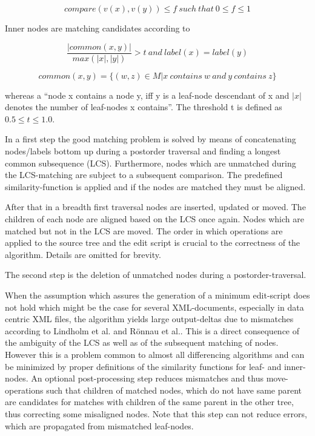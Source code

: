 \begin{equation} 
compare(v(x), v(y)) \leq f\ such\ that\ 0 \leq f \leq 1
\end{equation}

Inner nodes are matching candidates according to

\begin{equation}
\frac{|common(x, y)|}{max(|x|,|y|)} > t\ and\ label(x) = label(y)
\end{equation}

\begin{equation}
common(x,y) = \{(w,z) \in M | x\ contains\ w\ and\ y\ contains\ z\}
\end{equation}

whereas a ``node x contains a node y, iff y is a leaf-node descendant of x and $|x|$ denotes the number of leaf-nodes x contains''. The threshold t is defined as $0.5 \leq t \leq 1.0$.

In a first step the good matching problem is solved by means of concatenating nodes/labels bottom up during a postorder traversal and finding a longest common subsequence (LCS). Furthermore, nodes which are unmatched during the LCS-matching are subject to a subsequent comparison. The predefined similarity-function is applied and if the nodes are matched they must be aligned. 

After that in a breadth first traversal nodes are inserted, updated or moved. The children of each node are aligned based on the LCS once again. Nodes which are matched but not in the LCS are moved. The order in which operations are applied to the source tree and the edit script is crucial to the correctness of the algorithm. Details are omitted for brevity.

The second step is the deletion of unmatched nodes during a postorder-traversal.

When the assumption which assures the generation of a minimum edit-script does not hold which might be the case for several XML-documents, especially in data centric XML files, the algorithm yields large output-deltas due to mismatches according to Lindholm et al.\cite{lindholm2006fast} and Rönnau et al.\cite{ronnau2009efficient}. This is a direct consequence of the ambiguity of the LCS as well as of the subsequent matching of nodes. However this is a problem common to almost all differencing algorithms and can be minimized by proper definitions of the similarity functions for leaf- and inner-nodes. An optional post-processing step reduces mismatches and thus move-operations such that children of matched nodes, which do not have same parent are candidates for matches with children of the same parent in the other tree, thus correcting some misaligned nodes. Note that this step can not reduce errors, which are propagated from mismatched leaf-nodes.

